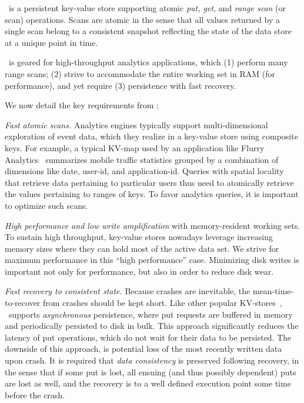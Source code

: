 

\sys\ is a persistent key-value store supporting atomic \emph{put, get}, and  \emph{range scan} (or scan) operations. 
Scans are atomic in the sense that all values returned by a single scan belong to a consistent snapshot reflecting
the state of the data store at a unique point in time.

\sys\ is geared for high-throughput analytics applications, which (1) perform many range scans; 
(2) strive to accommodate the entire working set in RAM (for performance), and yet require  (3)
persistence with fast recovery. 

We now detail the key requirements from \sys:

\emph{Fast atomic scans.}
Analytics engines typically support multi-dimensional exploration of event data, which they realize in a key-value store using composite keys.   For example, a typical  KV-map used by an application like Flurry Analytics~\cite{flurry} 
summarizes mobile traffic statistics grouped by a combination of dimensions like  date,  user-id, and application-id.
Queries with spatial locality that retrieve data pertaining to particular users thus need to atomically 
retrieve the values pertaining to ranges of keys. 
To favor analytics queries, it is important to optimize  such scans. 
 
\emph{High performance and low write amplification} with memory-resident working sets.
To sustain high throughput, key-value stores nowadays leverage increasing memory sizes where they can hold most of the 
active data set. We strive for maximum performance in this ``high performance'' case.  
Minimizing disk writes is important not only for performance, but also in order to reduce disk wear.

\emph{Fast recovery to consistent state.}
Because crashes are inevitable, the mean-time-to-recover from crashes should be kept short.
Like other popular KV-stores~\cite{rocksdb,leveldb,hbase}, \sys\ supports \emph{asynchronous} persistence, 
where put requests are buffered in memory and periodically persisted to disk in bulk. 
This approach significantly reduces the latency of put operations, which do not wait for their data to be persisted.
The downside of this approach, is potential loss of the most recently written data upon crash. 
It is required that \emph{data consistency} is preserved following recovery, in the sense that 
if some put is lost, all ensuing (and thus possibly dependent) puts are lost as well, and the recovery is to a well 
defined execution point some time before the crash.
 
